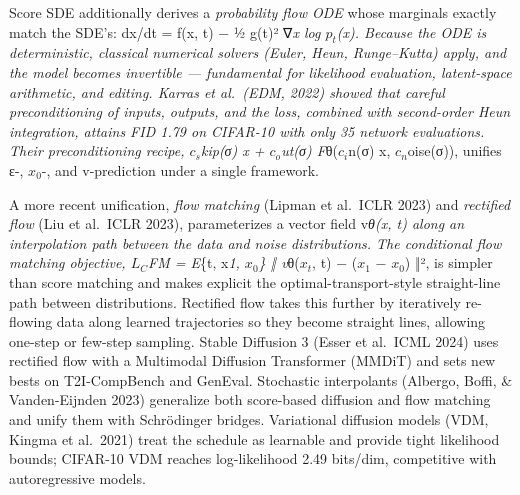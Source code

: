 Score SDE additionally derives a \emph{probability flow ODE} whose marginals exactly match the SDE's: dx/dt = f(x, t) − ½ g(t)² ∇\emph{x log \(p_t\)(x). Because the ODE is deterministic, classical numerical solvers (Euler, Heun, Runge--Kutta) apply, and the model becomes invertible --- fundamental for likelihood evaluation, latent-space arithmetic, and editing. Karras et al.~(EDM, 2022) showed that careful preconditioning of inputs, outputs, and the loss, combined with second-order Heun integration, attains FID 1.79 on CIFAR-10 with only 35 network evaluations. Their preconditioning recipe, \(c_s\)kip(σ) x + \(c_o\)ut(σ) F}θ(\(c_i\)n(σ) x, \(c_n\)oise(σ)), unifies ε-, \(x_0\)-, and v-prediction under a single framework.

A more recent unification, \emph{flow matching} (Lipman et al.~ICLR 2023) and \emph{rectified flow} (Liu et al.~ICLR 2023), parameterizes a vector field v\emph{θ(x, t) along an interpolation path between the data and noise distributions. The conditional flow matching objective, \(L_C\)FM = E}\{t, x\emph{1, \(x_0\)\} ‖ v}θ(\(x_t\), t) − (\(x_1\) − \(x_0\)) ‖², is simpler than score matching and makes explicit the optimal-transport-style straight-line path between distributions. Rectified flow takes this further by iteratively re-flowing data along learned trajectories so they become straight lines, allowing one-step or few-step sampling. Stable Diffusion 3 (Esser et al.~ICML 2024) uses rectified flow with a Multimodal Diffusion Transformer (MMDiT) and sets new bests on T2I-CompBench and GenEval. Stochastic interpolants (Albergo, Boffi, \& Vanden-Eijnden 2023) generalize both score-based diffusion and flow matching and unify them with Schrödinger bridges. Variational diffusion models (VDM, Kingma et al.~2021) treat the schedule as learnable and provide tight likelihood bounds; CIFAR-10 VDM reaches log-likelihood 2.49 bits/dim, competitive with autoregressive models.

